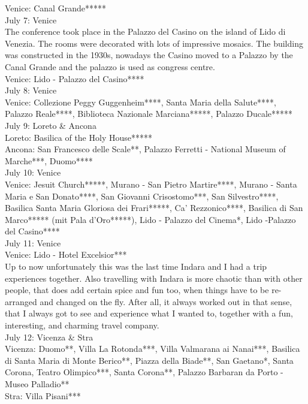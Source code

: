 Venice: Canal Grande*****\\

July 7: Venice\\
The conference took place in the Palazzo del Casino on the island of Lido di Venezia. The rooms were decorated with lots of impressive mosaics. The building was constructed in the 1930s, nowadays the Casino moved to a Palazzo by the Canal Grande and the palazzo is used as congress centre.\\

Venice: Lido - Palazzo del Casino****\\

July 8: Venice\\
Venice: Collezione Peggy Guggenheim****, Santa Maria della Salute****, Palazzo Reale****, Biblioteca Nazionale Marciana*****, Palazzo Ducale*****\\

July 9: Loreto \& Ancona\\
Loreto: Basilica of the Holy House*****\\
Ancona: San Francesco delle Scale**, Palazzo Ferretti - National Museum of Marche***, Duomo****\\

July 10: Venice\\
Venice: Jesuit Church*****, Murano - San Pietro Martire****, Murano - Santa Maria e San Donato****, San Giovanni Crisostomo***, San Silvestro****, Basilica Santa Maria Gloriosa dei Frari*****, Ca' Rezzonico****, Basilica di San Marco***** (mit Pala d'Oro*****), Lido - Palazzo del Cinema*, Lido -Palazzo del Casino****\\

July 11: Venice\\
Venice: Lido - Hotel Excelsior***\\

Up to now unfortunately this was the last time Indara and I had a trip experiences together. Also travelling with Indara is more chaotic than with other people, that does add certain spice and fun too, when things have to be re-arranged and changed on the fly. After all, it always worked out in that sense, that I always got to see and experience what I wanted to, together with a fun, interesting, and charming travel company.\\

July 12: Vicenza \& Stra\\
Vicenza: Duomo**, Villa La Rotonda***, Villa Valmarana ai Nanai***, Basilica di Santa Maria di Monte Berico**, Piazza della Biade**, San Gaetano*, Santa Corona, Teatro Olimpico***, Santa Corona**, Palazzo Barbaran da Porto - Museo Palladio**\\
Stra: Villa Pisani***\\

